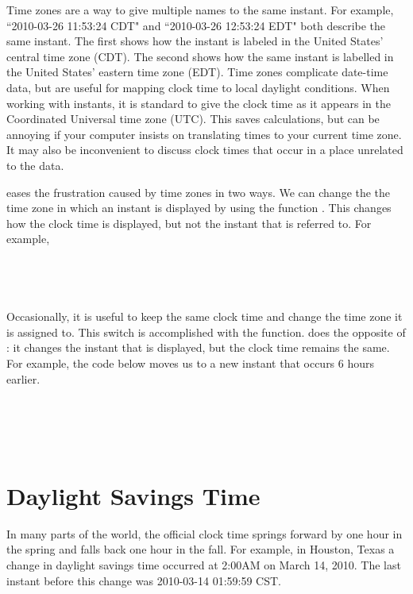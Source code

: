 \documentclass[article]{jss}
\begin{document}
Time zones are a way to give multiple names to the same instant. For example, ``2010-03-26 11:53:24 CDT" and ``2010-03-26 12:53:24 EDT" both describe the same instant. The first shows how the instant is labeled in the United States' central time zone (CDT). The second shows how the same instant is labelled in the United States' eastern time zone (EDT). Time zones complicate date-time data, but are useful for mapping clock time to local daylight conditions. When working with instants, it is standard to give the clock time as it appears in the Coordinated Universal time zone (UTC).  This saves calculations, but can be annoying if your computer insists on translating times to your current time zone.  It may also be inconvenient to discuss clock times that occur in a place unrelated to the data.

 eases the frustration caused by time zones in two ways. We can change the the time zone in which an instant is displayed by using the function . This changes how the clock time is displayed, but not the instant that is referred to. For example,\\

\\
\\
\\
\\

Occasionally, it is useful to keep the same clock time and change the time zone it is assigned to. This switch is accomplished with the  function.  does the opposite of : it changes the instant that is displayed, but the clock time remains the same. For example, the code below moves us to a new instant that occurs 6 hours earlier.\\

\\
\\
\\
\\


\section{Daylight Savings Time}
\label{sec:DST}

In many parts of the world, the official clock time springs forward by one hour in the spring and falls back one hour in the fall. For example, in Houston, Texas a change in daylight savings time occurred at 2:00AM on March 14, 2010. The last instant before this change was 2010-03-14 01:59:59 CST.\\
\end{document}
